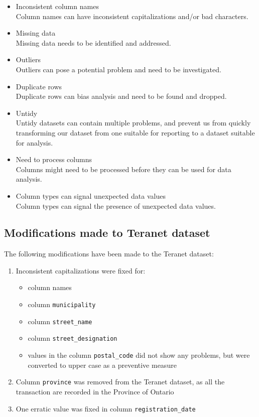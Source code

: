 \documentclass[11pt]{article}
\begin{document}
    \begin{itemize}
        \item Inconsistent column names \\
        Column names can have inconsistent capitalizations and/or bad characters.
        \item Missing data \\
        Missing data needs to be identified and addressed.
        \item Outliers \\
        Outliers can pose a potential problem and need to be investigated.
        \item Duplicate rows \\
        Duplicate rows can bias analysis and need to be found and dropped.
        \item Untidy \\
        Untidy datasets can contain multiple problems, and prevent us from quickly transforming our dataset from one suitable for reporting to a dataset suitable for analysis.
        \item Need to process columns \\
        Columns might need to be processed before they can be used for data analysis.
        \item Column types can signal unexpected data values \\
        Column types can signal the presence of unexpected data values.
    \end{itemize}

    \subsection{Modifications made to Teranet dataset} \label{subsec:teranet_modifications}

    The following modifications have been made to the Teranet dataset:

    \begin{enumerate}
        \item Inconsistent capitalizations were fixed for:
        \begin{itemize}
            \item column names
            \item column \texttt{municipality}
            \item column \texttt{street\_name}
            \item column \texttt{street\_designation}
            \item values in the column \texttt{postal\_code} did not show any problems, but were converted to upper case as a preventive measure
        \end{itemize}
        \item Column \texttt{province} was removed from the Teranet dataset, as all the transaction are recorded in the Province of Ontario
        \item One erratic value was fixed in column \texttt{registration\_date}
    \end{enumerate}
\end{document}
